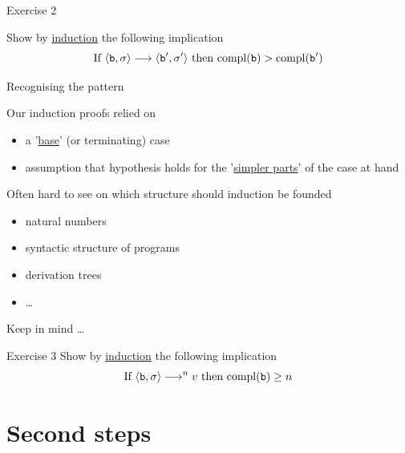 \documentclass{beamer}
\begin{document}
\begin{frame}{Exercise 2}

        Show by \alert{\underline{induction}} the following 
        implication
        \[
                \text{If } \langle \mathtt{b}, \sigma \rangle \longrightarrow \langle \mathtt{b}', \sigma' \rangle 
                \text{ then }
                \mathrm{compl}(\mathtt{b}) > \mathrm{compl}(\mathtt{b}')
       \]
\end{frame}

\begin{frame}{Recognising the pattern}

        Our induction proofs relied on
        \begin{itemize}
                \item a '\alert{\underline{base}}' (or terminating) case
                \item assumption that hypothesis holds for the
                        '\alert{\underline{simpler parts}}' of the case at hand
        \end{itemize}

        \pause
        Often hard to see on which structure should induction be founded
        \begin{itemize}
                \item natural numbers
                \item syntactic structure of programs
                \item derivation trees
                \item \dots
        \end{itemize}
\end{frame}

\begin{frame}{Keep in mind \dots}

        \centering

\end{frame}

\begin{frame}{Exercise 3}
        Show by \alert{\underline{induction}} the following 
        implication
        \[
                \text{If } \langle \mathtt{b}, \sigma \rangle \longrightarrow^n v 
                \text{ then }
                \mathrm{compl}(\mathtt{b}) \geq n 
       \]
\end{frame}

\section{Second steps}
\end{document}
